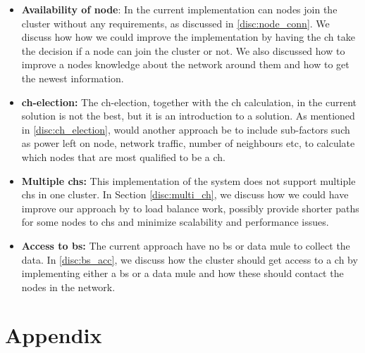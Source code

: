 \documentclass[USenglish]{uit-thesis}
\begin{document}
\begin{itemize}
\item \textbf{Availability of node}: In the current implementation can nodes join the cluster without any requirements, as discussed in \autoref{disc:node_conn}. We discuss how  how we could improve the implementation by having the \gls{ch} take the decision if a node can join the cluster or not. We also discussed how to improve a nodes knowledge about the network around them and how to get the newest information.

\item \textbf{\gls{ch}-election:} The \gls{ch}-election, together with the \gls{ch} calculation, in the current solution is not the best, but it is an introduction to a solution. As mentioned in \autoref{disc:ch_election}, would another approach be to include sub-factors such as power left on node, network traffic, number of neighbours etc, to calculate which nodes that are most qualified to be a \gls{ch}. 

\item \textbf{Multiple \glspl{ch}:} This implementation of the system does not support multiple \glspl{ch} in one cluster. In Section \autoref{disc:multi_ch}, we discuss how we could have improve our approach by to load balance work, possibly provide shorter paths for some nodes to \glspl{ch} and minimize scalability and performance issues.

\item \textbf{Access to \gls{bs}:} The current approach have no \gls{bs} or data mule to collect the data. In \autoref{disc:bs_acc}, we discuss how the cluster should get access to a \gls{ch} by implementing either a \gls{bs} or a data mule and how these should contact the nodes in the network.

\end{itemize}



\chapter{Appendix}



\backmatter


\newpage{}
\end{document}
